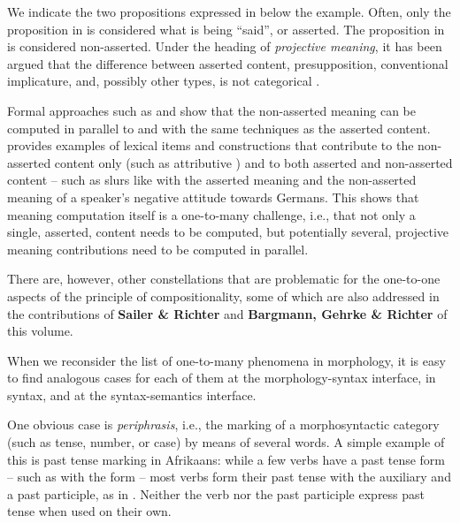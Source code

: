 \documentclass[output=paper]{langscibook}
\begin{document}
We indicate the two propositions expressed in  below
the example.  Often, only the proposition in  is
considered what is being ``said'', or asserted.  The proposition in
 is considered non-asserted.  Under the heading of
\emph{projective meaning}, it has been argued that the difference
between asserted content, presupposition, conventional implicature,
and, possibly other types, is not categorical
\citep{Tonhauser:al:13,AnderBois:al:15}.

Formal approaches such as \citet{Potts:05} and \citet{Liu:12} show that
the non-asserted meaning can be computed in parallel to and with the
same techniques as the asserted content.  \citet{Gutzmann2013} provides
examples of lexical items and constructions that contribute to the
non-asserted content only (such as attributive ) and to both
asserted and non-asserted content -- such as slurs like 
with the asserted meaning  and the non-asserted
meaning of a speaker's negative attitude towards Germans.  This shows
that meaning computation itself is a one-to-many challenge, i.e., that
not only a single, asserted, content needs to be computed, but
 potentially several, projective meaning contributions need to be
computed in parallel.

\begin{sloppypar}
  There are, however, other constellations that are problematic for
  the one-to-one aspects of the principle of compositionality, some of
  which are also addressed in the contributions of \textbf{Sailer \&
    Richter} and \textbf{Bargmann, Gehrke \& Richter} of this volume.
\end{sloppypar}


When we reconsider the list of one-to-many phenomena in morphology, it
is easy to find analogous cases for each of them at the
morphology-syntax interface, in syntax, and at the syntax-semantics
interface.  

One obvious case is \emph{periphrasis}, i.e., the marking of a
morphosyntactic category (such as tense, number, or case) by means of
several words.  A simple example of this is past tense marking in
Afrikaans: while a few verbs have a past tense form -- such as
 with the form  -- most verbs form
their past tense with the auxiliary  and a past
participle, as in . Neither the verb
 nor the past participle  express past tense
when used on their own.
\end{document}
